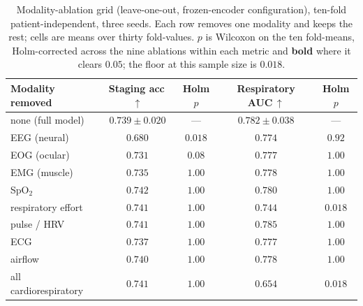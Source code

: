 \documentclass[a4paper,fleqn]{cas-sc}
\begin{document}
\begin{table}[H]
\caption{Modality-ablation grid (leave-one-out, frozen-encoder configuration), ten-fold
patient-independent, three seeds. Each row removes one modality and keeps the rest; cells are means over
thirty fold-values. $p$ is Wilcoxon on the ten fold-means, Holm-corrected across the
nine ablations within each metric and \textbf{bold} where it clears $0.05$; the
floor at this sample size is $0.018$.}
\label{tab:ablate}
\centering
\setlength{\tabcolsep}{14pt}
\begin{tabular}{lcccc}
\toprule
Modality removed & Staging acc\,$\uparrow$ & Holm $p$ & Respiratory AUC\,$\uparrow$ & Holm $p$ \\
\midrule
 none (full model)        & $0.739 \pm 0.020$   & ---                 & $0.782 \pm 0.038$   & --- \\
 EEG (neural)             & $0.680$             & $\mathbf{0.018}$    & $0.774$             & $0.92$ \\
 EOG (ocular)             & $0.731$             & $0.08$              & $0.777$             & $1.00$ \\
 EMG (muscle)             & $0.735$             & $1.00$              & $0.778$             & $1.00$ \\
 SpO$_2$                  & $0.742$             & $1.00$              & $0.780$             & $1.00$ \\
 respiratory effort       & $0.741$             & $1.00$              & $0.744$             & $\mathbf{0.018}$ \\
 pulse / HRV              & $0.741$             & $1.00$              & $0.785$             & $1.00$ \\
 ECG                      & $0.737$             & $1.00$              & $0.777$             & $1.00$ \\
 airflow                  & $0.740$             & $1.00$              & $0.778$             & $1.00$ \\
 all cardiorespiratory    & $0.741$             & $1.00$              & $0.654$             & $\mathbf{0.018}$ \\
\bottomrule
\end{tabular}
\end{table}
\end{document}
